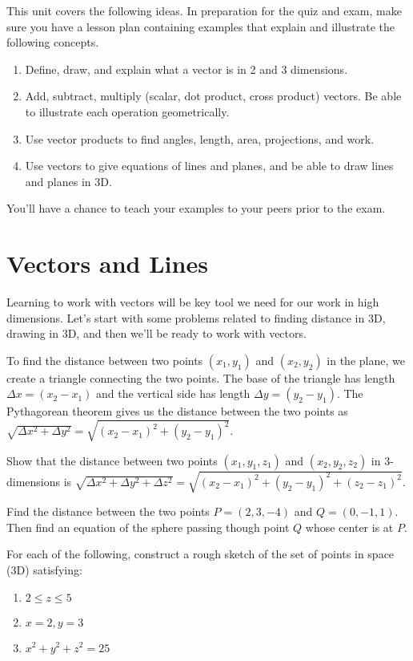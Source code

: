 
\noindent 
This unit covers the following ideas. In preparation for the quiz and exam, make sure you have a lesson plan containing examples that explain and illustrate the following concepts.  
\begin{enumerate}
\item Define, draw, and explain what a vector is in 2 and 3 dimensions.
\item Add, subtract, multiply (scalar, dot product, cross product) vectors. Be able to illustrate each operation geometrically.
\item Use vector products to find angles, length, area, projections, and work.
\item Use vectors to give equations of lines and planes, and be able to draw lines and planes in 3D.

\end{enumerate}
You'll have a chance to teach your examples to your peers prior to the exam.

\section{Vectors and Lines}
Learning to work with vectors will be key tool we need for our work in high dimensions.  Let's start with some problems related to finding distance in 3D, drawing in 3D, and then we'll be ready to work with vectors.


\begin{problem}
To find the distance between two points $(x_1,y_1)$ and $(x_2,y_2)$ in the plane, we create a triangle connecting the two points.  The base of the triangle has length $\Delta x=(x_2-x_1)$ and the vertical side has length $\Delta y=(y_2-y_1)$. The Pythagorean theorem gives us the distance between the two points as $\sqrt{\Delta x^2+\Delta y^2}=\sqrt{(x_2-x_1)^2+(y_2-y_1)^2}$.

Show that the distance between two points $(x_1,y_1,z_1)$ and $(x_2,y_2,z_2)$ in 3-dimensions is $\sqrt{\Delta x^2+\Delta y^2+\Delta z^2}=\sqrt{(x_2-x_1)^2+(y_2-y_1)^2+(z_2-z_1)^2}$.
\end{problem}

\begin{problem}
Find the distance between the two points $P=(2,3,-4)$ and $Q=(0,-1,1)$. Then find an equation of the sphere passing though point $Q$ whose center is at $P$.
\end{problem}


\begin{problem}
For each of the following, construct a rough sketch of the set of points in space (3D) satisfying:
\begin{enumerate}
\item $2\leq z\leq 5$
\item $x=2,y=3$
\item $x^2+y^2+z^2=25$
\end{enumerate}
\end{problem}

